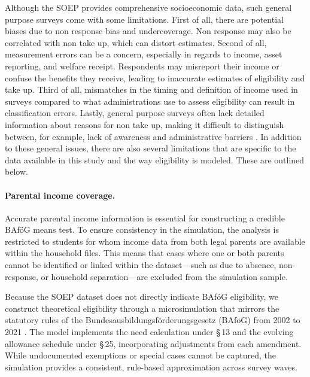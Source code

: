 Although the SOEP provides comprehensive socioeconomic data, such general purpose surveys come with some limitations. First of all, there are potential biases due to non response bias and undercoverage. Non response may also be correlated with non take up, which can distort estimates. Second of all, measurement errors can be a concern, especially in regards to income, asset reporting, and welfare receipt. Respondents may misreport their income or confuse the benefits they receive, leading to inaccurate estimates of eligibility and take up. Third of all, mismatches in the timing and definition of income used in surveys compared to what administrations use to assess eligibility can result in classification errors. Lastly, general purpose surveys often lack detailed information about reasons for non take up, making it difficult to distinguish between, for example, lack of awareness and administrative barriers \citep{mechelen_who_2017}. In addition to these general issues, there are also several limitations that are specific to the data available in this study and the way eligibility is modeled. These are outlined below.

\paragraph{Parental income coverage.} %
Accurate parental income information is essential for constructing a credible BAföG means test. 
To ensure consistency in the simulation, the analysis is restricted to students for whom income data from both legal parents are available within the household files. 
This means that cases where one or both parents cannot be identified or linked within the dataset—such as due to absence, non-response, or household separation—are excluded from the simulation sample.

Because the SOEP dataset does not directly indicate BAföG eligibility, we construct theoretical eligibility through a microsimulation that mirrors the statutory rules of the Bundesausbildungsförderungsgesetz (BAföG) from 2002 to 2021 \citep{bafoeg_law,bafoeg20,bafoeg21,bafoeg22,bafoeg23,bafoeg24,bafoeg25,bafoeg26,bafoeg27,bafoeg28,bafoeg29}. 
The model implements the need calculation under §\,13 and the evolving allowance schedule under §\,25, incorporating adjustments from each amendment. 
While undocumented exemptions or special cases cannot be captured, the simulation provides a consistent, rule-based approximation across survey waves.

